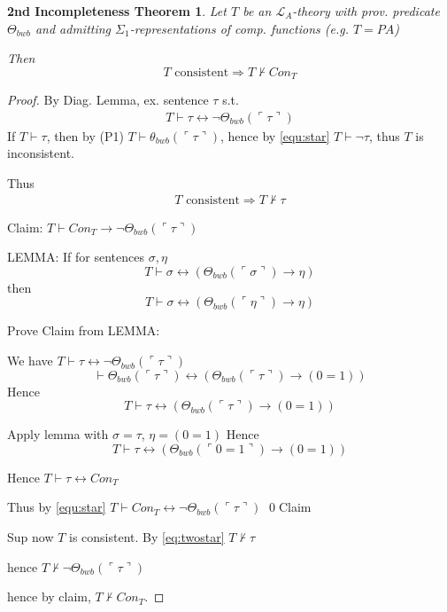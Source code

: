 \documentclass[12pt]{article}
\newcommand{\proves}{\vdash}
\newcommand{\gn}[1]{\ulcorner #1 \urcorner}
\begin{document}
\newtheorem*{secondincomp}{2nd Incompleteness Theorem}
\begin{secondincomp}
  Let $T$ be an $\mathcal{L}_A$-theory with prov. predicate $\Theta_{bwb}$
  and admitting $\Sigma_1$-representations of comp. functions
  (e.g. $T = PA$)

  Then 
  \[
  T \text{ consistent} \Rightarrow T \not\proves Con_T
  \]
\end{secondincomp}
\begin{proof}
  By Diag. Lemma, ex. sentence $\tau$ s.t.
  \begin{align}
    T \proves \tau \leftrightarrow \neg\Theta_{bwb}(\gn{\tau})
    \label{equ:star}
  \end{align}
  If $T \proves \tau$, then by (P1) $T \proves \theta_{bwb}(\gn{\tau})$,
  hence by \ref{equ:star} $T \proves \neg\tau$, thus $T$ is inconsistent.

  Thus
  \begin{align}
    T \text{ consistent} \Rightarrow T \not\proves \tau
    \label{eq:twostar}
  \end{align}

  Claim: $T \proves Con_T \rightarrow \neg \Theta_{bwb}(\gn{\tau})$

  LEMMA: If for sentences $\sigma, \eta$
  \[
  T \proves \sigma \leftrightarrow (\Theta_{bwb}(\gn{\sigma}) \rightarrow \eta)
  \]
  then
  \[
  T \proves \sigma \leftrightarrow (\Theta_{bwb}(\gn{\eta}) \rightarrow \eta)
  \]

  Prove Claim from LEMMA:

  We have $T \proves \tau \leftrightarrow \neg \Theta_{bwb}(\gn{\tau})$
  \[
  \proves \Theta_{bwb}(\gn{\tau}) \leftrightarrow (\Theta_{bwb}(\gn{\tau}) \rightarrow (0 = 1))
  \]
  Hence
  \[
  T \proves \tau \leftrightarrow (\Theta_{bwb}(\gn{\tau}) \rightarrow (0 = 1))
  \]

  Apply lemma with $\sigma = \tau$, $\eta = (0 = 1)$
  Hence \[
  T \proves \tau \leftrightarrow (\Theta_{bwb}(\gn{0=1}) \rightarrow (0 = 1))
  \]

  Hence $T \proves \tau \leftrightarrow Con_T$

  Thus by \ref{equ:star}
  $T \proves Con_T \leftrightarrow \neg\Theta_{bwb}(\gn{\tau})$
  \qed Claim

  Sup now $T$ is consistent.  By \ref{eq:twostar} $T \not\proves \tau$

  hence $T \not\proves \neg \Theta_{bwb}(\gn{\tau})$

  hence by claim, $T \not\proves Con_T$.
\end{proof}
\end{document}
